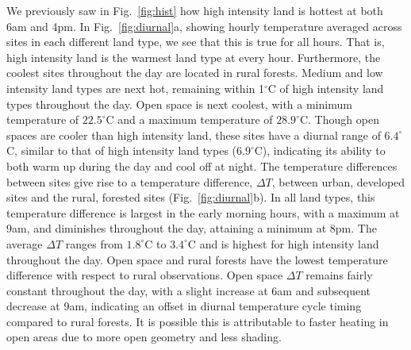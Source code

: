 \documentclass[draft,linenumbers]{agujournal}
\begin{document}
We previously saw in Fig.~\ref{fig:hist} how high intensity land is hottest at both 6am and 4pm.  In Fig.~\ref{fig:diurnal}a, showing hourly temperature averaged across sites in each different land type, we see that this is true for all hours. That is, high intensity land is the warmest land type at every hour. Furthermore, the coolest sites throughout the day are located in rural forests. 
Medium and low intensity land types are next hot, remaining within 1$^\circ$C of high intensity land types throughout the day. Open space is next coolest, with a minimum temperature of $22.5^\circ$C and a maximum temperature of $28.9^\circ$C. 
Though open spaces are cooler than high intensity land, these sites have a diurnal range of $6.4^\circ$C, similar to that of high intensity land types ($6.9^\circ$C), indicating its ability to both warm up during the day and cool off at night. 
The temperature differences between sites give rise to a temperature difference, $\Delta T$, between urban, developed sites and the rural, forested sites (Fig.~\ref{fig:diurnal}b). 
In all land types, this temperature difference is largest in the early morning hours, with a maximum at 9am, and diminishes throughout the day, attaining a minimum at 8pm. The average $\Delta T$ ranges from $1.8^\circ$C to $3.4^\circ$C
and is highest for high intensity land throughout the day. Open space and rural forests have the lowest temperature difference with respect to rural observations. Open space $\Delta T$ remains fairly constant throughout the day, with a slight increase at 6am and subsequent decrease at 9am, indicating an offset in diurnal temperature cycle timing compared to rural forests. It is possible this is attributable to faster heating in open areas due to more open geometry and less shading. 
\end{document}
